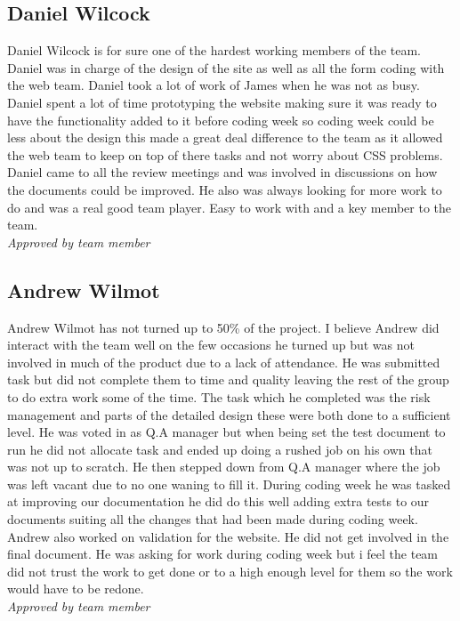 \subsection{Daniel Wilcock}
    Daniel Wilcock is for sure one of the hardest working members of the team. Daniel was in charge of the design of the site as well as all the form coding with the web team. Daniel took a lot of work of James when he was not as busy. Daniel spent a lot of time prototyping the website making sure it was ready to have the functionality added to it before coding week so coding week could be less about the design this made a great deal difference to the team as it allowed the web team to keep on top of there tasks and not worry about CSS problems.
    Daniel came to all the review meetings and was involved in discussions on how the documents could be improved. He also was always looking for more work to do and was a real good team player. Easy to work with and a key member to the team.\\
    \emph{Approved by team member}

\subsection{Andrew Wilmot}
    Andrew Wilmot has not turned up to 50\% of the project. I believe Andrew did interact with the team well on the few occasions he turned up but was not involved in much of the product due to a lack of attendance. He was submitted task but did not complete them to time and quality leaving the rest of the group to do extra work some of the time. The task which he completed was the risk management and parts of the detailed design these were both done to a sufficient level.  He was voted in as Q.A manager but when being set the test document to run he did not allocate task and ended up doing a rushed job on his own that was not up to scratch. He then stepped down from Q.A manager where the job was left vacant due to no one waning to fill it. During coding week he was tasked at improving our documentation he did do this well adding extra tests to our documents suiting all the changes that had been made during coding week. Andrew also worked on validation for the website. He did not get involved in the final document. He was asking for work during coding week but i feel the team did not trust the work to get done or to a high enough level for them so the work would have to be redone.\\
    \emph{Approved by team member}
